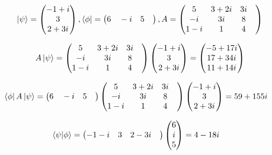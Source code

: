\documentclass[10pt,a4paper]{article}
\begin{document}
\begin{align}
\ket{\psi} = \begin{pmatrix}
-1+ i\\
3\\
2+3i\\
\end{pmatrix}, \bra{\phi} = \begin{pmatrix}
6\quad-i\quad5\quad\end{pmatrix}, A = \begin{pmatrix}
5&3+2i&3i&\\-i&3i&8&\\1-i&1&4&\\\end{pmatrix}\end{align}

\begin{align}
A\ket{\psi} = \begin{pmatrix}
5&3+2i&3i&\\-i&3i&8&\\1-i&1&4&\\\end{pmatrix}\begin{pmatrix}
-1+ i\\
3\\
2+3i\\
\end{pmatrix}=\begin{pmatrix}
-5+17i\\
17+34i\\
11+14i\\
\end{pmatrix}\end{align}

\begin{align}
\bra{\phi}A\ket{\psi}= \begin{pmatrix}
6\quad-i\quad5\quad\end{pmatrix}\begin{pmatrix}
5&3+2i&3i&\\-i&3i&8&\\1-i&1&4&\\\end{pmatrix}\begin{pmatrix}
-1+ i\\
3\\
2+3i\\
\end{pmatrix}=59+155i &\end{align}

\begin{align}
\braket{\psi|\phi}= \begin{pmatrix}
-1-i\quad3\quad2-3i\quad\end{pmatrix}\begin{pmatrix}
6\\
 i\\
5\\
\end{pmatrix}=4-18i &\end{align}
\end{document}
